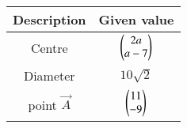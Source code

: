 \begin{tabular}{ |c| c|}
    \hline
    \textbf{Description}  & \textbf{ Given value}\\
    \hline
    Centre  & $\begin{pmatrix}2a\\a-7\end{pmatrix}$\\
    \hline
    Diameter & $10\sqrt{2}$\\
    \hline
    point $\vec{A}$ & $\begin{pmatrix}11\\-9\end{pmatrix}$\\
    \hline
\end{tabular}
